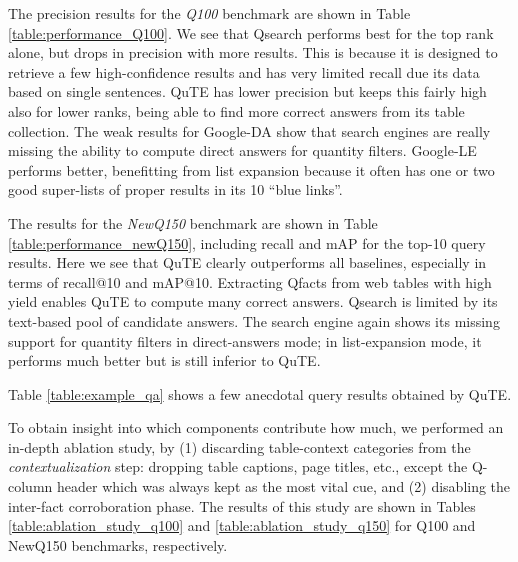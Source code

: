 %




\vspace{0.1cm}

The precision results for the \textit{Q100} benchmark are shown in
Table \ref{table:performance_Q100}.
We see that Qsearch performs best for the top rank alone,
but drops in precision with more results.
This is because it is designed to retrieve a few
high-confidence results and has very limited
recall due its data based on single sentences.
QuTE has lower precision but keeps this fairly
high also for lower ranks, being able to find
more correct answers from its table collection.
The weak results for Google-DA show that
search engines are really missing the ability
to compute direct answers for quantity filters.
Google-LE performs better, benefitting from
list expansion because it often has one or two
good super-lists of proper results in its 10 
``blue links''.
%

The results for the \textit{NewQ150} benchmark are shown in
Table \ref{table:performance_newQ150},
including recall and mAP for the top-10 query results.
Here we see that QuTE clearly outperforms all
baselines, especially in terms of recall@10 and
mAP@10. Extracting Qfacts from web tables with high yield
enables QuTE to compute many correct answers. 
Qsearch is limited by its text-based pool of candidate answers.
The search engine again shows its missing support
for quantity filters in direct-answers mode;
in list-expansion mode, it performs much better
but is still inferior to QuTE.
%

Table \ref{table:example_qa} shows a few anecdotal query results obtained by QuTE.
%



\vspace{0.1cm}
To obtain insight into which components contribute how much,
we performed an in-depth ablation study, by 
(1) discarding table-context categories from the \textit{contextualization} step: dropping table captions, page titles, etc., except the Q-column header which was always kept as the most vital cue,
and (2) disabling the inter-fact corroboration phase. 
The results 
of this study 
are shown in Tables \ref{table:ablation_study_q100} and \ref{table:ablation_study_q150} for Q100 and NewQ150 benchmarks, respectively. 

